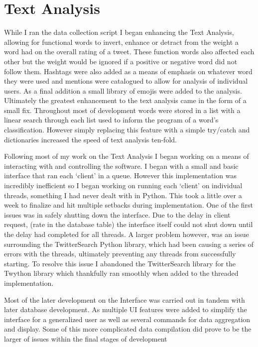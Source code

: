 \documentclass[12pt,a4paper]{report}
\begin{document}
  \section{Text Analysis}
  While I ran the data collection script I began enhancing the Text Analysis, allowing for functional words to invert, enhance or detract from the weight a word had on the overall rating of a tweet. These function words also affected each other but the weight would be ignored if a positive or negative word did not follow them. Hashtags were also added as a means of emphasis on whatever word they were used and mentions were catalogued to allow for analysis of individual users. As a final addition a small library of emojis were added to the analysis. Ultimately the greatest enhancement to the text analysis came in the form of a small fix. Throughout most of development words were stored in a list with a linear search through each list used to inform the program of a word’s classification. However simply replacing this feature with a simple try/catch and dictionaries increased the speed of text analysis ten-fold.
  \par
  Following most of my work on the Text Analysis I began working on a means of interacting with and controlling the software. I began with a small and basic interface that ran each ‘client’ in a queue. However this implementation was incredibly inefficient so I began working on running each ‘client’ on individual threads, something I had never dealt with in Python. This took a little over a week to finalize and hit multiple setbacks during implementation. One of the first issues was in safely shutting down the interface. Due to the delay in client request, (rate in the database table) the interface itself could not shut down until the delay had completed for all threads. A larger problem however, was an issue surrounding the TwitterSearch\cite{TwitterSearch} Python library, which had been causing a series of errors with the threads, ultimately preventing any threads from successfully starting. To resolve this issue I abandoned the TwitterSearch\cite{TwitterSearch} library for the Twython\cite{Twython} library which thankfully ran smoothly when added to the threaded implementation.
  \par
  Most of the later development on the Interface was carried out in tandem with later database development. As multiple UI features were added to simplify the interface for a generalized user as well as several commands for data aggregation and display. Some of this more complicated data compilation did prove to be the larger of issues within the final stages of development
\end{document}

